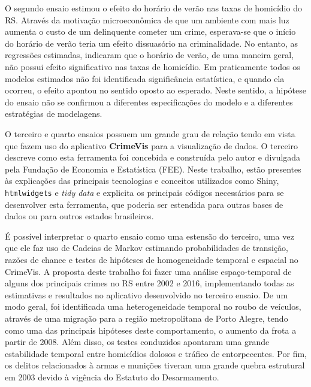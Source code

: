 \documentclass[12pt,openright,oneside,a4paper,english,french,spanish]{abntex2}
\numberwithin{table}{section} %
\numberwithin{figure}{section} %
\begin{document}
O segundo ensaio estimou o efeito do horário de verão nas taxas de homicídio do RS. Através da motivação microeconômica de que um ambiente com mais luz aumenta o custo de um delinquente cometer um crime, esperava-se que o início do horário de verão teria um efeito dissuasório na criminalidade. No entanto, as regressões estimadas, indicaram que o horário de verão, de uma maneira geral, não possui efeito significativo nas taxas de homicídio. Em praticamente todos os modelos estimados não foi identificada significância estatística, e quando ela ocorreu, o efeito apontou no sentido oposto ao esperado. Neste sentido, a hipótese do ensaio não se confirmou a diferentes especificações do modelo e a diferentes estratégias de modelagens.

O terceiro e quarto ensaios possuem um grande grau de relação tendo em vista que fazem uso do aplicativo \textbf{CrimeVis} para a visualização de dados. O terceiro descreve como esta ferramenta foi concebida e construída pelo autor e divulgada pela Fundação de Economia e Estatística (FEE). Neste trabalho, estão presentes às explicações das principais tecnologias e conceitos utilizados como Shiny, \texttt{htmlwidgets} e \textit{tidy data} e explicita os principais códigos necessários para se desenvolver esta ferramenta, que poderia ser estendida para outras bases de dados ou para outros estados brasileiros.

É possível interpretar o quarto ensaio como uma estensão do terceiro, uma vez que ele faz uso de Cadeias de Markov estimando probabilidades de transição, razões de chance e testes de hipóteses de homogeneidade temporal e espacial no CrimeVis. A proposta deste trabalho foi fazer uma análise espaço-temporal de alguns dos principais crimes no RS entre 2002 e 2016, implementando todas as estimativas e resultados no aplicativo desenvolvido no terceiro ensaio. De um modo geral, foi identificada uma heterogeneidade temporal no roubo de veículos, através de uma migração para a região metropolitana de Porto Alegre, tendo como uma das principais hipóteses deste comportamento, o aumento da frota a partir de 2008. Além disso, os testes conduzidos apontaram uma grande estabilidade temporal entre homicídios dolosos e tráfico de entorpecentes. Por fim, os delitos relacionados à armas e munições tiveram uma grande quebra estrutural em 2003 devido à vigência do Estatuto do Desarmamento.
























%

\end{document}

